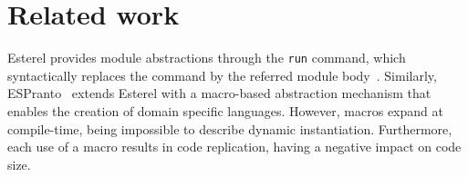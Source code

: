 \documentclass{acm_proc_article-sp}
\newcommand{\CEU}{\textsc{C\'{e}u}\xspace}
\newcommand{\code}[1] {{\small{\texttt{#1}}}}
\newcommand{\1}{\;}
\newcommand{\2}{\;\;}
\newcommand{\3}{\;\;\;}
\newcommand{\5}{\;\;\;\;\;}
\begin{document}

\section{Related work}
\label{sec.related}


Esterel provides module abstractions through the \code{run} command, which 
syntactically replaces the command by the referred module 
body~\cite{esterel.primer}.
%
Similarly, ESPranto~\cite{espranto} extends Esterel with a macro-based 
abstraction mechanism that enables the creation of domain specific languages.
%
However, macros expand at compile-time, being impossible to describe dynamic 
instantiation.
Furthermore, each use of a macro results in code replication, having a negative 
impact on code size.
\end{document}
